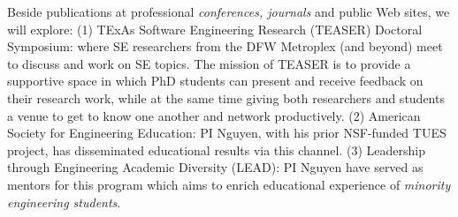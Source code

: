 Beside publications at professional \emph{conferences, journals} and
public Web sites, we will explore:
%
(1) TExAs Software Engineering Research (TEASER) Doctoral Symposium:
where SE researchers from the DFW Metroplex (and beyond) meet to
discuss and work on SE topics.  The mission of TEASER is to provide a
supportive space in which PhD students can present and receive
feedback on their research work, while at the same time giving both
researchers and students a venue to get to know one another and
network productively.  (2) American Society for Engineering Education:
PI Nguyen, with his prior NSF-funded TUES project, has disseminated
educational results via this channel.
(3) Leadership through Engineering Academic Diversity (LEAD): PI
Nguyen have served as mentors for this program which aims to enrich
educational experience of {\em minority engineering students}.


